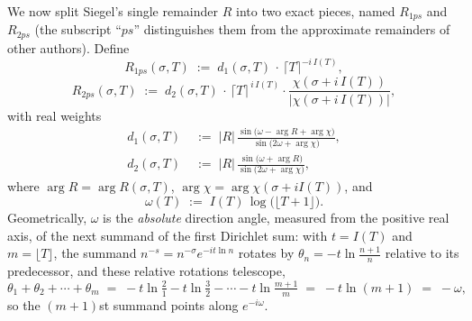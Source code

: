 \documentclass[11pt]{article}
\theoremstyle{definition}
\begin{document}
We now split Siegel's single remainder $R$ into two exact pieces, named
$R_{1ps}$ and $R_{2ps}$ (the subscript ``$ps$'' distinguishes them from the
approximate remainders of other authors). Define
\begin{equation}\label{eq:R1ps-def}
R_{1ps}(\sigma, T) \;:=\; d_{1}(\sigma, T)\,\cdot\, \lceil T \rceil^{-i\,I(T)},
\end{equation}
\begin{equation}\label{eq:R2ps-def}
R_{2ps}(\sigma, T) \;:=\; d_{2}(\sigma, T)\,\cdot\, \lceil T \rceil^{\,i\,I(T)}
\cdot \frac{\chi(\sigma + i\,I(T))}{|\chi(\sigma + i\,I(T))|},
\end{equation}
with real weights
\begin{align}
d_{1}(\sigma,T) &\;:=\; |R|\,
\frac{\sin\!\bigl(\omega - \arg R + \arg\chi\bigr)}{\sin\!\bigl(2\omega + \arg\chi\bigr)},
\label{eq:d1}\\[4pt]
d_{2}(\sigma,T) &\;:=\; |R|\,
\frac{\sin\!\bigl(\omega + \arg R\bigr)}{\sin\!\bigl(2\omega + \arg\chi\bigr)},
\label{eq:d2}
\end{align}
where $\arg R=\arg R(\sigma,T)$, $\arg\chi=\arg\chi(\sigma+iI(T))$, and
\begin{equation}
\omega(T) \;:=\; I(T)\,\log\!\bigl(\lfloor T+1\rfloor\bigr).
\end{equation}
Geometrically, $\omega$ is the \emph{absolute} direction angle, measured from
the positive real axis, of the next summand of the first Dirichlet sum: with
$t=I(T)$ and $m=\lfloor T\rfloor$, the summand $n^{-s}=n^{-\sigma}e^{-it\ln n}$
rotates by $\theta_n=-t\ln\tfrac{n+1}{n}$ relative to its predecessor, and these
relative rotations telescope,
\begin{equation}\label{eq:omega-telescope}
\theta_1+\theta_2+\cdots+\theta_m
\;=\;
-t\ln\tfrac{2}{1}-t\ln\tfrac{3}{2}-\cdots-t\ln\tfrac{m+1}{m}
\;=\;
-t\ln(m+1)
\;=\;
-\omega,
\end{equation}
so the $(m+1)$st summand points along $e^{-i\omega}$.
\end{document}
